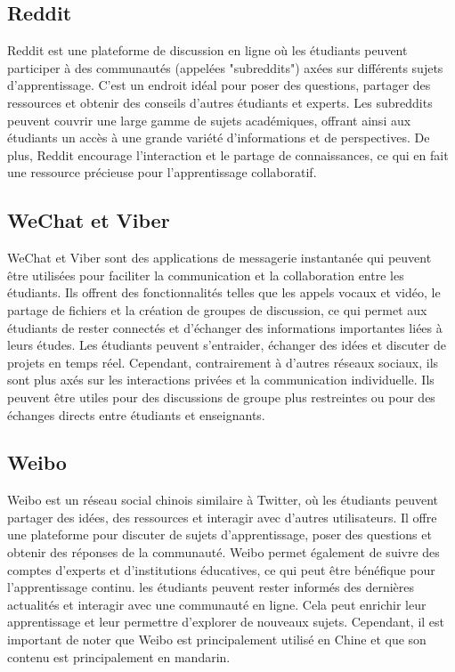 \documentclass[12pt,a4paper,titlepage]{article}
\begin{document}
\subsection{Reddit}
Reddit est une plateforme de discussion en ligne où les étudiants peuvent participer à des communautés (appelées "subreddits") axées sur différents sujets d'apprentissage. C'est un endroit idéal pour poser des questions, partager des ressources et obtenir des conseils d'autres étudiants et experts. Les subreddits peuvent couvrir une large gamme de sujets académiques, offrant ainsi aux étudiants un accès à une grande variété d'informations et de perspectives. De plus, Reddit encourage l'interaction et le partage de connaissances, ce qui en fait une ressource précieuse pour l'apprentissage collaboratif.


\subsection{WeChat et Viber}
WeChat et Viber sont des applications de messagerie instantanée qui peuvent être utilisées pour faciliter la communication et la collaboration entre les étudiants. Ils offrent des fonctionnalités telles que les appels vocaux et vidéo, le partage de fichiers et la création de groupes de discussion, ce qui permet aux étudiants de rester connectés et d'échanger des informations importantes liées à leurs études. Les étudiants peuvent s'entraider, échanger des idées et discuter de projets en temps réel. Cependant, contrairement à d'autres réseaux sociaux, ils sont plus axés sur les interactions privées et la communication individuelle. Ils peuvent être utiles pour des discussions de groupe plus restreintes ou pour des échanges directs entre étudiants et enseignants.



\subsection{Weibo}
Weibo est un réseau social chinois similaire à Twitter, où les étudiants peuvent partager des idées, des ressources et interagir avec d'autres utilisateurs. Il offre une plateforme pour discuter de sujets d'apprentissage, poser des questions et obtenir des réponses de la communauté. Weibo permet également de suivre des comptes d'experts et d'institutions éducatives, ce qui peut être bénéfique pour l'apprentissage continu. les étudiants peuvent rester informés des dernières actualités et interagir avec une communauté en ligne. Cela peut enrichir leur apprentissage et leur permettre d'explorer de nouveaux sujets. Cependant, il est important de noter que Weibo est principalement utilisé en Chine et que son contenu est principalement en mandarin.
\end{document}
